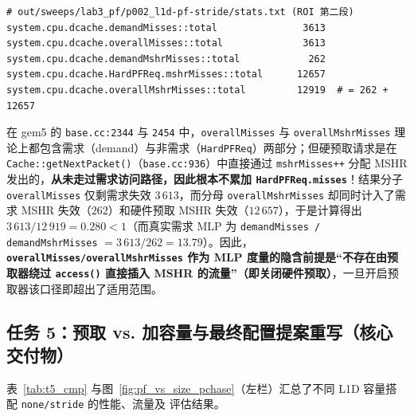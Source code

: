 \documentclass[12pt,a4paper,fontset=mac]{ctexart}
\begin{document}
\begin{enumerate}
\begin{lstlisting}[language={},caption={任务 4 方法学陷阱：framework/stats.py 与 gem5/base.cc 口径及 stride 实测计数}]
# out/sweeps/lab3_pf/p002_l1d-pf-stride/stats.txt (ROI 第二段)
system.cpu.dcache.demandMisses::total               3613
system.cpu.dcache.overallMisses::total              3613
system.cpu.dcache.demandMshrMisses::total            262
system.cpu.dcache.HardPFReq.mshrMisses::total      12657
system.cpu.dcache.overallMshrMisses::total         12919  # = 262 + 12657
  \end{lstlisting}
  在 gem5 的 \texttt{base.cc:2344} 与 \texttt{2454} 中，\texttt{overallMisses} 与 \texttt{overallMshrMisses} 理论上都包含需求（demand）与非需求（\texttt{HardPFReq}）两部分；但硬预取请求是在 \texttt{Cache::getNextPacket()}（\texttt{base.cc:936}）中直接通过 \texttt{mshrMisses++} 分配 MSHR 发出的，\textbf{从未走过需求访问路径，因此根本不累加 \texttt{HardPFReq.misses}}！结果分子 \texttt{overallMisses} 仅剩需求失效 $3\,613$，而分母 \texttt{overallMshrMisses} 却同时计入了需求 MSHR 失效（$262$）和硬件预取 MSHR 失效（$12\,657$），于是计算得出 $3\,613 / 12\,919 = 0.280 < 1$（而真实需求 MLP 为 \texttt{demandMisses / demandMshrMisses} $= 3\,613 / 262 = 13.79$）。因此，\textbf{\texttt{overallMisses/overallMshrMisses} 作为 MLP 度量的隐含前提是“不存在由预取器绕过 \texttt{access()} 直接插入 MSHR 的流量”（即关闭硬件预取）}，一旦开启预取器该口径即超出了适用范围。
\end{enumerate}

\subsection{任务 5：预取 vs. 加容量与最终配置提案重写（核心交付物）}
表~\ref{tab:t5_cmp} 与图~\ref{fig:pf_vs_size_pchase}（左栏）汇总了不同 L1D 容量搭配 \texttt{none/stride} 的性能、流量及  评估结果。
\end{document}
